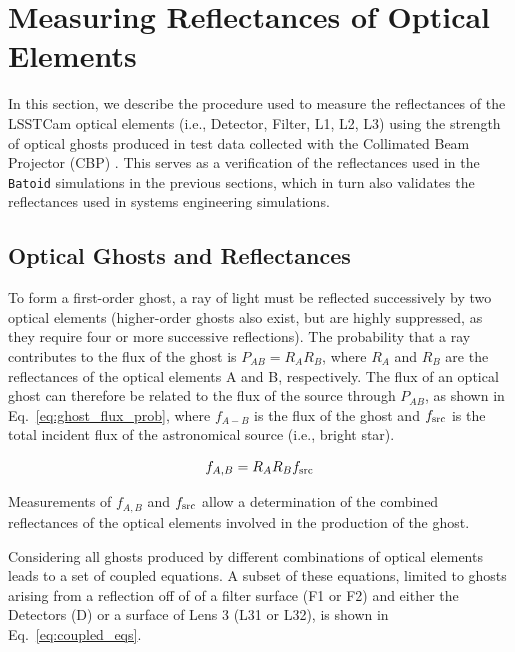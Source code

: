 \section{Measuring Reflectances of Optical Elements \label{sec:reflectances}}
In this section, we describe the procedure used to measure the reflectances of the LSSTCam optical elements (i.e., Detector, Filter, L1, L2, L3) using the strength of optical ghosts produced in test data collected with the Collimated Beam Projector (CBP) \citep{2016SPIE.9906E..0OI}. 
This serves as a verification of the reflectances used in the \texttt{Batoid} simulations in the previous sections, which in turn also validates the reflectances used in systems engineering simulations.

\subsection{Optical Ghosts and Reflectances}
\label{sec:reflectance_theory}
To form a first-order ghost, a ray of light must be reflected successively by two optical elements (higher-order ghosts also exist, but are highly suppressed, as they require four or more successive reflections).
The probability that a ray contributes to the flux of the ghost is $P_{AB} = R_A R_B$, where $R_A$ and $R_B$ are the reflectances of the optical elements A and B, respectively.
The flux of an optical ghost can therefore be related to the flux of the source through $P_{AB}$, as shown in Eq.~\ref{eq:ghost_flux_prob}, where $f_{A-B}$ is the flux of the ghost and $f_{\rm src}$ is the total incident flux of the astronomical source (i.e., bright star).

\begin{equation}
\label{eq:ghost_flux_prob}
f_{A,B} = R_A R_B f_{\rm src}
\end{equation}

\noindent Measurements of $f_{A,B}$ and $f_{\rm src}$ allow a determination of the combined reflectances of the optical elements involved in the production of the ghost.

Considering all ghosts produced by different combinations of optical elements leads to a set of coupled equations.
A subset of these equations, limited to ghosts arising from a reflection off of of a filter surface (F1 or F2) and either the  Detectors (D) or a surface of Lens 3 (L31 or L32), is shown in Eq.~\ref{eq:coupled_eqs}.

